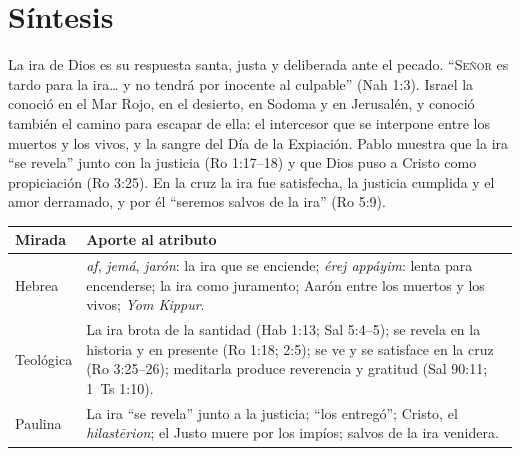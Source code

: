 \documentclass[11pt,letterpaper]{article}
\newcommand{\SENOR}{\textsc{Señor}}
\begin{document}
\section{Síntesis}

\begin{tcolorbox}[colback=papiro,colframe=azul,boxrule=1pt,arc=3pt]
La ira de Dios es su respuesta santa, justa y deliberada ante el pecado. ``\SENOR{} es tardo para la ira\ldots{} y no tendrá por inocente al culpable'' (Nah 1:3). Israel la conoció en el Mar Rojo, en el desierto, en Sodoma y en Jerusalén, y conoció también el camino para escapar de ella: el intercesor que se interpone entre los muertos y los vivos, y la sangre del Día de la Expiación. Pablo muestra que la ira ``se revela'' junto con la justicia (Ro 1:17--18) y que Dios puso a Cristo como propiciación (Ro 3:25). En la cruz la ira fue satisfecha, la justicia cumplida y el amor derramado, y por él ``seremos salvos de la ira'' (Ro 5:9).
\end{tcolorbox}

\begin{center}\small\renewcommand{\arraystretch}{1.3}
\begin{tabular}{@{}L{3.0cm}L{11.4cm}@{}}
\toprule
\textbf{Mirada} & \textbf{Aporte al atributo} \\ \midrule
Hebrea & \emph{af}, \emph{jemá}, \emph{jarón}: la ira que se enciende; \emph{érej appáyim}: lenta para encenderse; la ira como juramento; Aarón entre los muertos y los vivos; \emph{Yom Kippur}. \\
Teológica & La ira brota de la santidad (Hab 1:13; Sal 5:4--5); se revela en la historia y en presente (Ro 1:18; 2:5); se ve y se satisface en la cruz (Ro 3:25--26); meditarla produce reverencia y gratitud (Sal 90:11; 1~Ts 1:10). \\
Paulina & La ira ``se revela'' junto a la justicia; ``los entregó''; Cristo, el \emph{hilastērion}; el Justo muere por los impíos; salvos de la ira venidera. \\
\bottomrule
\end{tabular}\end{center}

\end{document}
